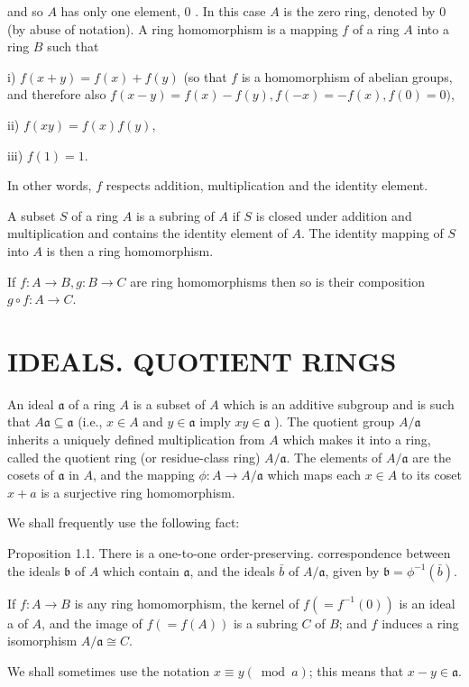 \documentclass{standalone}
\theoremstyle{definition}
\theoremstyle{remark}
\begin{document}
and so $A$ has only one element, 0 . In this case $A$ is the zero ring, denoted by 0 (by abuse of notation). A ring homomorphism is a mapping $f$ of a ring $A$ into a ring $B$ such that

i) $f(x+y)=f(x)+f(y)$ (so that $f$ is a homomorphism of abelian groups, and therefore also $f(x-y)=f(x)-f(y), f(-x)=-f(x), f(0)=0)$,

ii) $f(x y)=f(x) f(y)$,

iii) $f(1)=1$.

In other words, $f$ respects addition, multiplication and the identity element.

A subset $S$ of a ring $A$ is a subring of $A$ if $S$ is closed under addition and multiplication and contains the identity element of $A$. The identity mapping of $S$ into $A$ is then a ring homomorphism.

If $f: A \rightarrow B, g: B \rightarrow C$ are ring homomorphisms then so is their composition $g \circ f: A \rightarrow C$.

\section{IDEALS. QUOTIENT RINGS}
An ideal $\mathfrak{a}$ of a ring $A$ is a subset of $A$ which is an additive subgroup and is such that $A \mathfrak{a} \subseteq \mathfrak{a}$ (i.e., $x \in A$ and $y \in \mathfrak{a}$ imply $x y \in \mathfrak{a}$ ). The quotient group $A / \mathfrak{a}$ inherits a uniquely defined multiplication from $A$ which makes it into a ring, called the quotient ring (or residue-class ring) $A / \mathfrak{a}$. The elements of $A / \mathfrak{a}$ are the cosets of $\mathfrak{a}$ in $A$, and the mapping $\phi: A \rightarrow A / \mathfrak{a}$ which maps each $x \in A$ to its coset $x+a$ is a surjective ring homomorphism.

We shall frequently use the following fact:

Proposition 1.1. There is a one-to-one order-preserving. correspondence between the ideals $\mathfrak{b}$ of $A$ which contain $\mathfrak{a}$, and the ideals $\bar{b}$ of $A / \mathfrak{a}$, given by $\mathfrak{b}=\phi^{-1}(\bar{b})$.

If $f: A \rightarrow B$ is any ring homomorphism, the kernel of $f\left(=f^{-1}(0)\right)$ is an ideal a of $A$, and the image of $f(=f(A))$ is a subring $C$ of $B$; and $f$ induces a ring isomorphism $A / \mathfrak{a} \cong C$.

We shall sometimes use the notation $x \equiv y(\bmod a)$; this means that $x-y \in \mathfrak{a}$.
\end{document}

